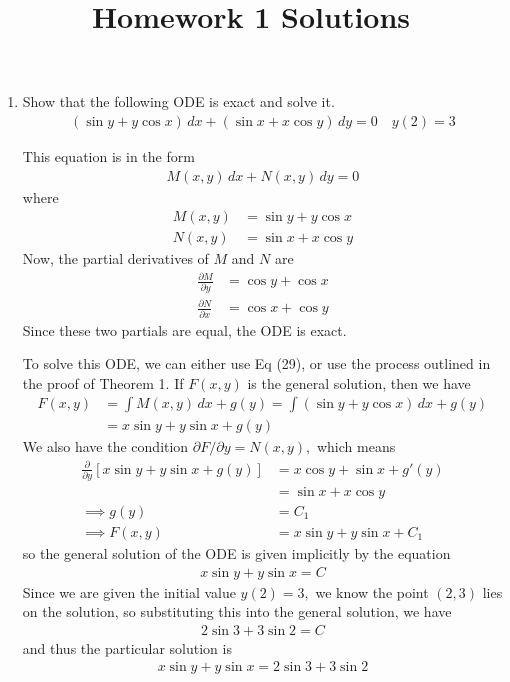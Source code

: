 \documentclass{article}
\begin{document}
\title{Homework 1 Solutions}
\maketitle
\thispagestyle{fancy}

\begin{enumerate}
	\item Show that the following ODE is exact and solve it.
		\begin{align*}
			(\sin y + y\cos x)\, dx + (\sin x + x\cos y)\, dy = 0 \quad y(2)=3
		\end{align*}
		\begin{soln}
			This equation is in the form
			\begin{align*}
				M(x, y)\, dx + N(x, y)\, dy = 0
			\end{align*}
			where
			\begin{align*}
				M(x, y) &= \sin y + y\cos x \\ 
				N(x, y) &= \sin x + x\cos y
			\end{align*}
			Now, the partial derivatives of $M$ and $N$ are
			\begin{align*}
				\frac{\partial M}{\partial y} &= \cos y + \cos x \\
				\frac{\partial N}{\partial x} &= \cos x + \cos y
			\end{align*}
			Since these two partials are equal, the ODE is exact. 

			To solve this ODE, we can either use Eq (29), or use the process outlined in the proof of Theorem 1. If $F(x, y)$ is the general solution, then we have
			\begin{align*}
				F(x, y) &= \int M(x, y)\, dx + g(y) = \int (\sin y + y\cos x)\, dx + g(y) \\
				&= x\sin y + y\sin x + g(y)
			\end{align*}
			We also have the condition $\partial F/\partial y = N(x, y),$ which means
			\begin{align*}
				\frac{\partial}{\partial y} \left[ x\sin y + y\sin x + g(y) \right] &= x\cos y + \sin x + g'(y) \\
				&= \sin x + x\cos y \\ 
				\implies g(y) &= C_1 \\
				\implies F(x, y) &= x\sin y + y\sin x + C_1
			\end{align*}
			so the general solution of the ODE is given implicitly by the equation
			\begin{align*}
				x\sin y + y\sin x = C
			\end{align*}
			Since we are given the initial value $y(2)=3,$ we know the point $(2, 3)$ lies on the solution, so substituting this into the general solution, we have
			\begin{align*}
				2\sin 3 + 3\sin 2 = C
			\end{align*}
			and thus the particular solution is 
			\begin{align*}
				\boxed{x\sin y + y\sin x = 2\sin 3 + 3\sin 2}
			\end{align*}
		\end{soln}


\end{enumerate}
\end{document}

